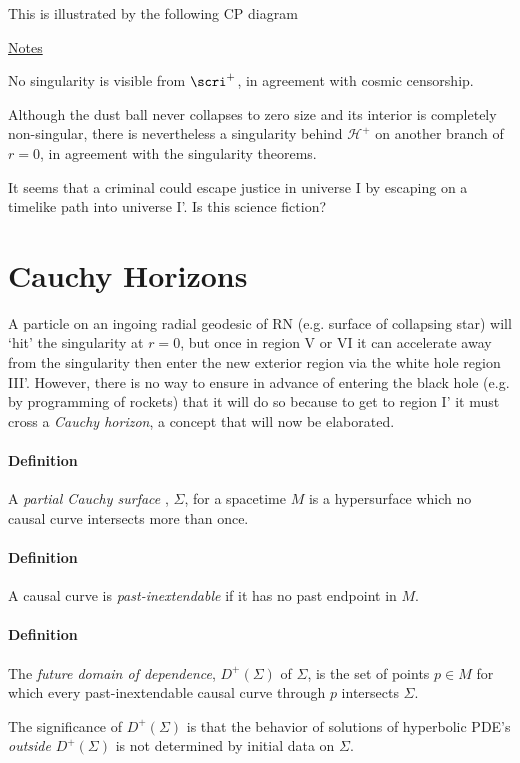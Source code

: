 \begin{list}{)}
This is illustrated by the following CP diagram
\begin{center}\end{center}
\ul{Notes}
\begin{list}{)}
{}
\item No singularity is visible from $\scri^+$, in agreement with cosmic 
censorship.
\item Although the dust ball never collapses to zero size and its interior 
is completely non-singular, there is nevertheless a singularity behind
$\mathcal{H}^+$ on another branch of $r=0$, in agreement with the singularity
theorems.
\item It seems that a criminal could escape justice in universe I by escaping 
on a timelike path into universe I'.  Is this science fiction?
\end{list}

\section{Cauchy Horizons}

A particle on an ingoing radial geodesic of RN (e.g. surface of 
collapsing star) will `hit' the singularity at $r=0$, but once in region V or VI
it can accelerate away from the singularity then enter the new exterior region
via the white hole region III'.  However, there is no way to ensure in advance
of entering the black hole (e.g. by programming of rockets) that it will do so
because to get to region I' it must cross a \emph{Cauchy
horizon}, a concept that will now be elaborated. 

\paragraph{Definition}  A \emph{partial Cauchy surface}
, $\Sigma$, for a spacetime $M$ is a hypersurface
which no causal curve intersects more than once. 

\paragraph{Definition}  A causal curve is \emph{past-inextendable} if 
it has no past endpoint in $M$.

\paragraph{Definition}  The \emph{future domain of dependence}, 
$D^+(\Sigma)$ of $\Sigma$, is the set of points $p\in M$ for which every
past-inextendable causal curve through $p$ intersects $\Sigma$.
\begin{center}\end{center}
The significance of $D^+(\Sigma)$ is that the behavior of solutions of 
hyperbolic PDE's \emph{outside} $D^+(\Sigma)$ is not determined by initial data
on $\Sigma$. \\


\end{list}
